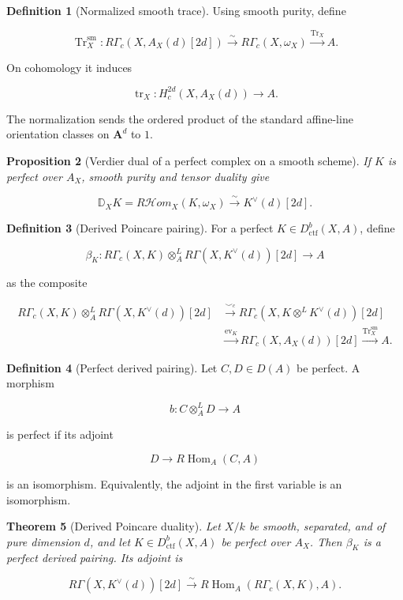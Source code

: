 \documentclass[10pt]{article}
\newtheorem{theorem}{Theorem}[section]
\newtheorem{proposition}[theorem]{Proposition}
\theoremstyle{definition}
\newtheorem{definition}[theorem]{Definition}
\newcommand{\Dctf}{D^b_{\mathrm{ctf}}}
\newcommand{\RHom}{R\mathcal Hom}
\newcommand{\RG}{R\Gamma}
\newcommand{\RGc}{R\Gamma_c}
\newcommand{\DD}{\mathbb D}
\newcommand{\Tr}{\operatorname{Tr}}
\begin{document}
\begin{definition}[Normalized smooth trace]
Using smooth purity, define

\[
 \Tr_X^{\mathrm{sm}}:
 \RGc(X,A_X(d)[2d])\xrightarrow{\sim}
 \RGc(X,\omega_X)\xrightarrow{\Tr_X}A.
\]

On cohomology it induces

\[
 \operatorname{tr}_X:
 H_c^{2d}(X,A_X(d))\longrightarrow A.
\]

The normalization sends the ordered product of the standard affine-line
orientation classes on \(\mathbf A^d\) to \(1\).
\end{definition}

\begin{proposition}[Verdier dual of a perfect complex on a smooth scheme]
If \(K\) is perfect over \(A_X\), smooth purity and tensor duality give

\[
 \DD_XK
 =\RHom_X(K,\omega_X)
 \xrightarrow{\sim}K^\vee(d)[2d].
\]
\end{proposition}

\begin{definition}[Derived Poincare pairing]
For a perfect \(K\in\Dctf(X,A)\), define

\[
 \beta_K:
 \RGc(X,K)\otimes_A^L\RG(X,K^\vee(d))[2d]\longrightarrow A
\]

as the composite

\[
\begin{aligned}
 \RGc(X,K)\otimes_A^L\RG(X,K^\vee(d))[2d]
 &\xrightarrow{\smile_c}
 \RGc(X,K\otimes^LK^\vee(d))[2d]\\
 &\xrightarrow{\operatorname{ev}_K}
 \RGc(X,A_X(d))[2d]
 \xrightarrow{\Tr_X^{\mathrm{sm}}}A.
\end{aligned}
\]
\end{definition}

\begin{definition}[Perfect derived pairing]
Let \(C,D\in D(A)\) be perfect.  A morphism

\[
 b:C\otimes_A^LD\longrightarrow A
\]

is perfect if its adjoint

\[
 D\longrightarrow R\operatorname{Hom}_A(C,A)
\]

is an isomorphism.  Equivalently, the adjoint in the first variable is an
isomorphism.
\end{definition}

\begin{theorem}[Derived Poincare duality]
Let \(X/k\) be smooth, separated, and of pure dimension \(d\), and let
\(K\in\Dctf(X,A)\) be perfect over \(A_X\).  Then \(\beta_K\) is a perfect
derived pairing.  Its adjoint is

\[
 \RG(X,K^\vee(d))[2d]
 \xrightarrow{\sim}
 R\operatorname{Hom}_A(\RGc(X,K),A).
\]
\end{theorem}
\end{document}
